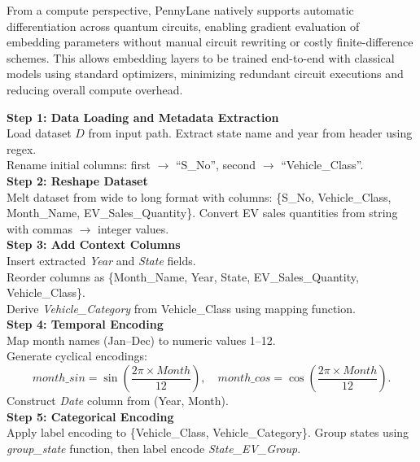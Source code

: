 \documentclass[pdflatex,sn-mathphys-num]{sn-jnl}%
\begin{document}
From a compute perspective, PennyLane natively supports automatic differentiation across quantum circuits, enabling gradient evaluation of embedding parameters without manual circuit rewriting or costly finite-difference schemes. This allows embedding layers to be trained end-to-end with classical models using standard optimizers, minimizing redundant circuit executions and reducing overall compute overhead.

\begin{algorithm}[H]
\caption{Preprocessing Pipeline for EV Sales Data}

\textbf{Step 1: Data Loading and Metadata Extraction} \\
Load dataset $D$ from input path.
Extract state name and year from header using regex. \\
Rename initial columns: first $\rightarrow$ ``S\_No'', second $\rightarrow$ ``Vehicle\_Class''. \\

\textbf{Step 2: Reshape Dataset} \\
Melt dataset from wide to long format with columns: \{S\_No, Vehicle\_Class, Month\_Name, EV\_Sales\_Quantity\}. 
Convert EV sales quantities from string with commas $\rightarrow$ integer values. \\

\textbf{Step 3: Add Context Columns} \\
Insert extracted \textit{Year} and \textit{State} fields. \\
Reorder columns as \{Month\_Name, Year, State, EV\_Sales\_Quantity, Vehicle\_Class\}. \\
Derive \textit{Vehicle\_Category} from Vehicle\_Class using mapping function. \\

\textbf{Step 4: Temporal Encoding} \\
Map month names (Jan–Dec) to numeric values 1–12. \\
Generate cyclical encodings:
\[
month\_sin = \sin\left(\frac{2\pi \times Month}{12}\right), \quad
month\_cos = \cos\left(\frac{2\pi \times Month}{12}\right).
\]
Construct \textit{Date} column from (Year, Month). \\

\textbf{Step 5: Categorical Encoding} \\
Apply label encoding to \{Vehicle\_Class, Vehicle\_Category\}.
Group states using \textit{group\_state} function, then label encode \textit{State\_EV\_Group}. \\


\end{algorithm}
\end{document}
